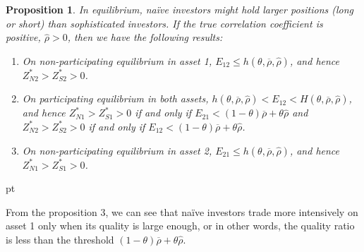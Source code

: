 \documentclass[10pt]{article}
\newtheorem{prop}{Proposition}
\begin{document}
\begin{prop}
In equilibrium, na\"ive investors might hold larger positions (long or short) than sophisticated investors. If the true correlation coefficient is positive, $ {\hat \rho} > 0 $, then we have the following results:
\begin{enumerate}
\item [(1).] On non-participating equilibrium in asset 1, $ E_{1 2} \leqslant h (\theta, \overline{\rho}, {\hat \rho}) $, and hence $ Z_{N 2}^* > Z_{S 2}^* > 0 $.
\item [(2).] On participating equilibrium in both assets, $ h (\theta, \overline{\rho}, {\hat \rho}) < E_{1 2} < H (\theta, \overline{\rho}, {\hat \rho}) $, and hence $ Z_{N 1}^* > Z_{S 1}^* > 0 $ if and only if $ E_{2 1} < (1 - \theta) \overline{\rho} + \theta {\hat \rho} $ and $ Z_{N 2}^* > Z_{S 2}^* > 0 $ if and only if $ E_{1 2} < (1 - \theta) \overline{\rho} + \theta {\hat \rho} $.
\item [(3).] On non-participating equilibrium in asset 2, $ E_{2 1} \leqslant h (\theta, \overline{\rho}, {\hat \rho}) $, and hence $ Z_{N 1}^* > Z_{S 1}^* > 0 $.
\end{enumerate}
\end{prop}

 pt

From the proposition 3, we can see that na\"ive investors trade more intensively on asset 1 only when its quality is large enough, or in other words, the quality ratio is less than the threshold $ (1 - \theta) \overline{\rho} + \theta {\hat \rho} $. 

\end{document}
